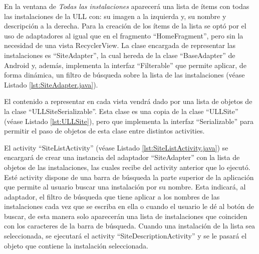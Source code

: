

En la ventana de \textit{Todas las instalaciones}  aparecerá una lista de ítems con todas las instalaciones  de la ULL con: su imagen a la izquierda y, su nombre y descripción a la derecha. Para la creación de los ítems de la lista se optó por el uso de adaptadores al igual que en el fragmento ``HomeFragment'', pero sin la necesidad de una vista RecyclerView. La clase encargada de representar las instalaciones es ``SiteAdapter'', la cual hereda de la clase ``BaseAdapter'' de Android y, además, implementa la interfaz ``Filterable'' que permite aplicar, de forma dinámica, un filtro de búsqueda sobre la lista de las instalaciones (véase Listado \ref{lst:SiteAdapter.java}). 



El contenido a representar en cada vista vendrá dado por una lista de objetos de la clase ``ULLSiteSerializable''. Esta clase es una copia de la clase ``ULLSite'' (véase Listado \ref{lst:ULLSite}), pero que implementa la interfaz ``Serializable'' para permitir el paso de objetos de esta clase entre distintos activities. 



El activity ``SiteListActivity'' (véase Listado \ref{lst:SiteListActivity.java}) se encargará de crear una instancia del adaptador ``SiteAdapter'' con la lista de objetos de las instalaciones, las cuales recibe del activity anterior que lo ejecutó. Esté activity dispone de una barra de búsqueda la parte superior de la aplicación que permite al usuario buscar una instalación por su nombre. Esta indicará, al adaptador, el filtro de búsqueda que tiene aplicar a los nombres de las instalaciones cada vez que se escriba en ella o cuando el usuario le dé al botón de buscar, de esta manera solo aparecerán una lista de instalaciones que coinciden con los caracteres de la barra de búsqueda. Cuando una instalación de la lista sea seleccionada, se ejecutará el activity ``SiteDescriptionActivity'' y se le pasará el objeto que contiene la instalación seleccionada.


    

